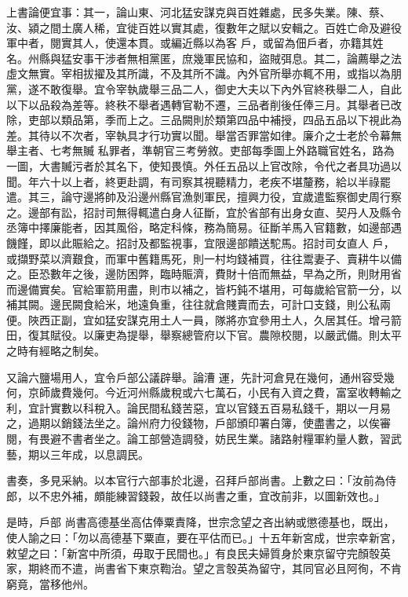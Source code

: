 \begin{pinyinscope}
 上書論便宜事：其一，論山東、河北猛安謀克與百姓雜處，民多失業。陳、蔡、汝、潁之間土廣人稀，宜徙百姓以實其處，復數年之賦以安輯之。百姓亡命及避役軍中者，閱實其人，使還本貫。或編近縣以為客
 戶，或留為佃戶者，亦籍其姓名。州縣與猛安事干涉者無相黨匿，庶幾軍民協和，盜賊弭息。其二，論薦舉之法虛文無實。宰相拔擢及其所識，不及其所不識。內外官所舉亦輒不用，或指以為朋黨，遂不敢復舉。宜令宰執歲舉三品二人，御史大夫以下內外官終秩舉二人，自此以下以品殺為差等。終秩不舉者遇轉官勒不遷，三品者削後任俸三月。其舉者已改除，吏部以類品第，季而上之。三品闕則於類第四品中補授，四品五品以下視此為差。其待以不次者，宰執具才行功實以聞。舉當否罪當如律。廉介之士老於令幕無舉主者、七考無贓
 私罪者，準朝官三考勞敘。吏部每季圖上外路職官姓名，路為一圖，大書贓污者於其名下，使知畏慎。外任五品以上官改除，令代之者具功過以聞。年六十以上者，終更赴調，有司察其視聽精力，老疾不堪釐務，給以半祿罷遣。其三，論守邊將帥及沿邊州縣官漁剝軍民，擅興力役，宜歲遣監察御史周行察之。邊部有訟，招討司無得輒遣白身人征斷，宜於省部有出身女直、契丹人及縣令丞簿中擇廉能者，因其風俗，略定科條，務為簡易。征斷羊馬入官籍數，如邊部遇饑饉，即以此賑給之。招討及都監視事，宜限邊部饋送駝馬。招討司女直人
 戶，或擷野菜以濟艱食，而軍中舊籍馬死，則一村均錢補買，往往鬻妻子、賣耕牛以備之。臣恐數年之後，邊防困弊，臨時賑濟，費財十倍而無益，早為之所，則財用省而邊備實矣。官給軍箭用盡，則市以補之，皆朽鈍不堪用，可每歲給官箭一分，以補其闕。邊民闕食給米，地遠負重，往往就倉賤賣而去，可計口支錢，則公私兩便。陜西正副，宜如猛安謀克用土人一員，隊將亦宜參用土人，久居其任。增弓箭田，復其賦役。以廉吏為提舉，舉察總管府以下官。農隙校閱，以嚴武備。則太平之時有經略之制矣。



 又論六鹽場用人，宜令戶部公議辟舉。論漕
 運，先計河倉見在幾何，通州容受幾何，京師歲費幾何。今近河州縣歲稅或六七萬石，小民有入資之費，富室收轉輸之利，宜計實數以科稅入。論民間私錢苦惡，宜以官錢五百易私錢千，期以一月易之，過期以銷錢法坐之。論州府力役錢物，戶部頒印署白簿，使盡書之，以俟審閱，有畏避不書者坐之。論工部營造調發，妨民生業。諸路射糧軍約量人數，習武藝，期以三年成，以息調民。



 書奏，多見采納。以本官行六部事於北邊，召拜戶部尚書。上數之曰：「汝前為侍郎，以不忠外補，頗能練習錢穀，故任以尚書之重，宜改前非，以圖新效也。」



 是時，戶部
 尚書高德基坐高估俸粟責降，世宗念望之吝出納或懲德基也，既出，使人諭之曰：「勿以高德基下粟直，要在平估而已。」十五年新宮成，世宗幸新宮，敕望之曰：「新宮中所須，毋取于民間也。」有良民夫婦質身於東京留守完顏彀英家，期終而不遣，尚書省下東京鞫治。望之言彀英為留守，其同官必且阿徇，不肯窮竟，當移他州。




\end{pinyinscope}
